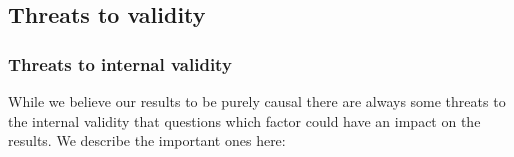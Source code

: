
\subsection{Threats to validity}


\subsubsection{Threats to internal validity} \mbox{}\par

While we believe our results to be purely causal there are always some threats to the internal validity that questions which factor could have an impact on the results. We describe the important ones here:

